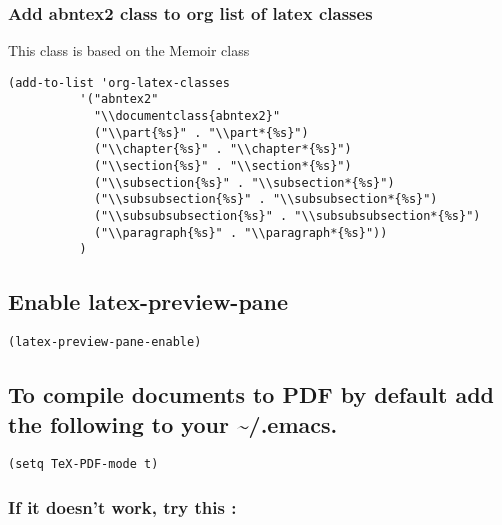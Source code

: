 \documentclass[11pt]{article}
\begin{document}
\subsubsection*{Add abntex2 class to org list of latex classes}
\label{sec:org92bec6a}
This class is based on the Memoir class
\begin{verbatim}
(add-to-list 'org-latex-classes
          '("abntex2"
            "\\documentclass{abntex2}"
            ("\\part{%s}" . "\\part*{%s}")
            ("\\chapter{%s}" . "\\chapter*{%s}")
            ("\\section{%s}" . "\\section*{%s}")
            ("\\subsection{%s}" . "\\subsection*{%s}")
            ("\\subsubsection{%s}" . "\\subsubsection*{%s}")
            ("\\subsubsubsection{%s}" . "\\subsubsubsection*{%s}")
            ("\\paragraph{%s}" . "\\paragraph*{%s}"))
          ) 
\end{verbatim}


\subsection*{Enable latex-preview-pane}
\label{sec:orge99aa1f}
\begin{verbatim}
(latex-preview-pane-enable)
\end{verbatim}

\subsection*{To compile documents to PDF by default add the following to your \textasciitilde{}/.emacs.}
\label{sec:orgea98f2d}

\begin{verbatim}
(setq TeX-PDF-mode t)
\end{verbatim}

\subsubsection*{If it doesn’t work, try this :}
\label{sec:org7d91a64}
\end{document}
